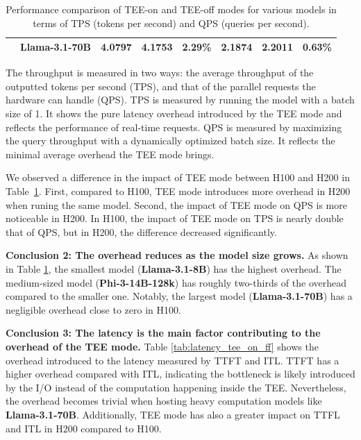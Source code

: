 \documentclass{article}
\begin{document}
\begin{table}[htbp]
\begin{tabular}{llccc|ccc}
                                       & \textbf{Llama-3.1-70B} & 4.0797                                      & 4.1753                                   & 2.29\%                                                                     & 2.1874          & 2.2011           & 0.63\%                                                                     \\
        \bottomrule
    \end{tabular}
    \caption{Performance comparison of TEE-on and TEE-off modes for various models in terms of TPS (tokens per second) and QPS (queries per second).}
    \label{tab:throughput_tee_on_ff}
\end{table}

The throughput is measured in two ways: the average throughput of the outputted tokens per second (TPS), and that of the parallel requests the hardware can handle (QPS). TPS is measured by running the model with a batch size of 1. It shows the pure latency overhead introduced by the TEE mode and reflects the performance of real-time requests. QPS is measured by maximizing the query throughput with a dynamically optimized batch size. It reflects the minimal average overhead the TEE mode brings.

We observed a difference in the impact of TEE mode between H100 and H200 in Table~\ref{tab:throughput_tee_on_ff}.
First, compared to H100, TEE mode introduces more overhead in H200 when runing the same model.
Second, the impact of TEE mode on QPS is more noticeable in H200.
In H100, the impact of TEE mode on TPS is nearly double that of QPS, but in H200, the difference decreased significantly.

\noindent\textbf{Conclusion 2: The overhead reduces as the model size grows.} As shown in Table \ref{tab:throughput_tee_on_ff}, the smallest model (\textbf{Llama-3.1-8B}) has the highest overhead. The medium-sized model (\textbf{Phi-3-14B-128k}) has roughly two-thirds of the overhead compared to the smaller one.
Notably, the largest model (\textbf{Llama-3.1-70B}) has a negligible overhead close to zero in H100.

\noindent\textbf{Conclusion 3: The latency is the main factor contributing to the overhead of the TEE mode.} Table \ref{tab:latency_tee_on_ff} shows the overhead introduced to the latency measured by TTFT and ITL. TTFT has a higher overhead compared with ITL, indicating the bottleneck is likely introduced by the I/O instead of the computation happening inside the TEE. Nevertheless, the overhead becomes trivial when hosting heavy computation models like \textbf{Llama-3.1-70B}.
Additionally, TEE mode has also a greater impact on TTFL and ITL in H200 compared to H100.
\end{document}
